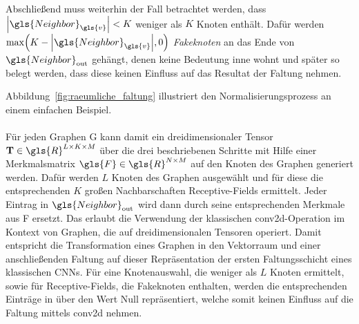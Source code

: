 Abschließend muss weiterhin der Fall betrachtet werden, dass $\left|\gls{Neighbor}_{\gls{v}}\right| < K$ weniger als $K$ Knoten enthält.
Dafür werden $\max\left(K - \left|\gls{Neighbor}_{\gls{v}}\right|, 0\right)$ \emph{Fakeknoten} an das Ende von $\gls{Neighbor}_{\mathrm{out}}$ gehängt, denen keine Bedeutung inne wohnt und später so belegt werden, dass diese keinen Einfluss auf das Resultat der Faltung nehmen.

Abbildung~\ref{fig:raeumliche_faltung} illustriert den Normalisierungsprozess an einem einfachen Beispiel.
\\\\
Für jeden Graphen \gls{G} kann damit ein dreidimensionaler Tensor $\ma{T} \in \gls{R}^{L \times K \times M}$ über die drei beschriebenen Schritte mit Hilfe einer Merkmalsmatrix $\gls{F} \in \gls{R}^{N \times M}$ auf den Knoten des Graphen generiert werden.
Dafür werden $L$ Knoten des Graphen ausgewählt und für diese die entsprechenden $K$ großen Nachbarschaften \bzw{} Receptive-Fields ermittelt.
Jeder Eintrag in $\gls{Neighbor}_{\mathrm{out}}$ wird dann durch seine entsprechenden Merkmale aus \gls{F} ersetzt.
Das erlaubt die Verwendung der klassischen \gls{conv2d}-Operation im Kontext von Graphen, die auf dreidimensionalen Tensoren operiert.
Damit entspricht die Transformation eines Graphen in den Vektorraum und einer anschließenden Faltung auf dieser Repräsentation der ersten Faltungsschicht eines klassischen \glspl{CNN}.
Für eine Knotenauswahl, die weniger als $L$ Knoten ermittelt, sowie für Receptive-Fields, die Fakeknoten enthalten, werden die entsprechenden Einträge in  über den Wert Null repräsentiert, welche somit keinen Einfluss auf die Faltung mittels \gls{conv2d} nehmen.

